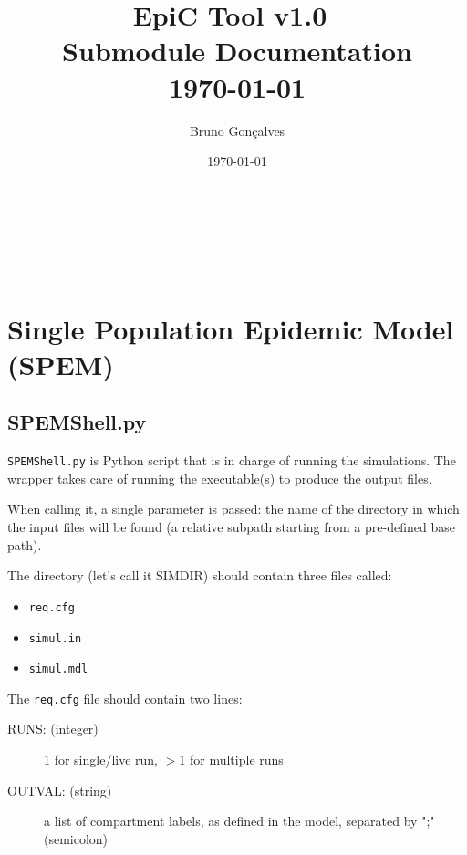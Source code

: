 \documentclass[a4paper, 11pt, fleqn]{paper}
\title{EpiC Tool v1.0~\\Submodule Documentation\\ \today}
\author{Bruno Gon\c calves}
\date{\today}
\begin{document}
\maketitle

\hfuzz=50pt

\setcounter{secnumdepth}{3}
\setcounter{tocdepth}{3}


~\\~\\~\\
\tableofcontents

\newpage

\section{Single Population Epidemic Model (SPEM)}

\subsection{SPEMShell.py}

\texttt{SPEMShell.py} is Python script that is in charge of running the simulations.
The wrapper takes care of running the executable(s) to 
produce the output files.

When calling it, a single parameter is passed:
the name of the directory in which the input files will be found (a
relative subpath starting from a pre-defined base path).


The directory (let's call it SIMDIR) should contain three files called:

\begin{itemize}
\item \texttt{req.cfg}
\item \texttt{simul.in}
\item \texttt{simul.mdl}
\end{itemize}

The  \texttt{req.cfg} file should contain two lines:

\begin{description}
\item  [RUNS:  (integer)]  $1$ for single/live run, $> 1$ for multiple runs 
\item  [OUTVAL: (string)]   a list of compartment labels, as defined in the model, separated by ";" (semicolon)
\end{description}
\end{document}
